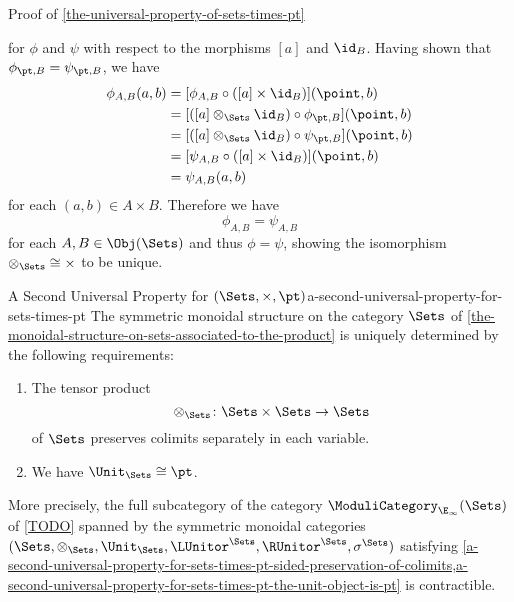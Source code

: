 \begin{Proof}{Proof of \cref{the-universal-property-of-sets-times-pt}}
\begin{webcompile}
    \end{webcompile}
    for $\phi$ and $\psi$ with respect to the morphisms $[a]$ and $\id_{B}$. Having shown that $\phi_{\pt,B}=\psi_{\pt,B}$, we have
    \begin{align*}
        \phi_{A,B}(a,b) &= [\phi_{A,B}\circ([a]\times\id_{B})](\point,b)\\
                        &= [([a]\otimes_{\Sets}\id_{B})\circ\phi_{\pt,B}](\point,b)\\
                        &= [([a]\otimes_{\Sets}\id_{B})\circ\psi_{\pt,B}](\point,b)\\
                        &= [\psi_{A,B}\circ([a]\times\id_{B})](\point,b)\\%
                        &= \psi_{A,B}(a,b)
    \end{align*}
    for each $(a,b)\in A\times B$. Therefore we have
    \[
        \phi_{A,B}%
        =%
        \psi_{A,B}%
    \]%
    for each $A,B\in\Obj(\Sets)$ and thus $\phi=\psi$, showing the isomorphism $\mathord{\otimes_{\Sets}}\cong\mathord{\times}$ to be unique.
\end{Proof}
\begin{corollary}{A Second Universal Property for $(\Sets,\times,\pt)$}{a-second-universal-property-for-sets-times-pt}%
    The symmetric monoidal structure on the category $\Sets$ of \cref{the-monoidal-structure-on-sets-associated-to-the-product} is uniquely determined by the following requirements:
    \begin{enumerate}
        \item\label{a-second-universal-property-for-sets-times-pt-sided-preservation-of-colimits}The tensor product
            \[
                \otimes_{\Sets}%
                \colon
                \Sets\times\Sets
                \to
                \Sets
            \]%
            of $\Sets$ preserves colimits separately in each variable.
        \item\label{a-second-universal-property-for-sets-times-pt-the-unit-object-is-pt}We have $\Unit_{\Sets}\cong\pt$.
    \end{enumerate}
    More precisely, the full subcategory of the category $\ModuliCategory_{\E_{\infty}}(\Sets)$ of \cref{TODO} spanned by the symmetric monoidal categories $(\Sets,\otimes_{\Sets},\Unit_{\Sets},\LUnitor^{\Sets},\RUnitor^{\Sets},\sigma^{\Sets})$ satisfying \cref{a-second-universal-property-for-sets-times-pt-sided-preservation-of-colimits,a-second-universal-property-for-sets-times-pt-the-unit-object-is-pt} is contractible.
\end{corollary}
